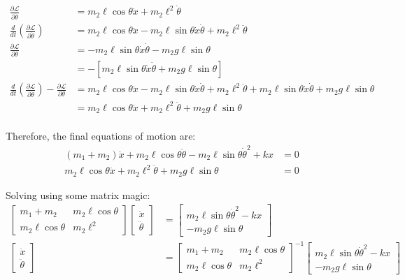 \documentclass[letterpaper,8pt]{article}
\begin{document}
\begin{align*}
\frac{\partial \mathcal{L}}{\partial \dot{\theta}} &= m_2\ell\cos\theta\dot{x} + m_2\ell^2\dot{\theta} \\
\frac{d}{dt} \left( \frac{\partial \mathcal{L}}{\partial \dot{\theta}} \right) &= m_2\ell\cos\theta\ddot{x} - m_2\ell\sin\theta\dot{x}\dot{\theta} 
         + m_2\ell^2\ddot{\theta} \\
\frac{\partial \mathcal{L}}{\partial \theta} &= -m_2\ell\sin\theta\dot{x}\dot{\theta} - m_2g\ell\sin\theta \\
         &= - \left[ m_2\ell\sin\theta\dot{x}\dot{\theta} + m_2g\ell\sin\theta \right] \\
\frac{d}{dt} \left( \frac{\partial \mathcal{L}}{\partial \dot{\theta}} \right) - \frac{\partial \mathcal{L}}{\partial \theta} &=
         m_2\ell\cos\theta\ddot{x} - m_2\ell\sin\theta\dot{x}\dot{\theta} + m_2\ell^2\ddot{\theta} 
         + m_2\ell\sin\theta\dot{x}\dot{\theta} + m_2g\ell\sin\theta \\
         &= m_2\ell\cos\theta\ddot{x} + m_2\ell^2\ddot{\theta} + m_2g\ell\sin\theta \\
\end{align*}


Therefore, the final equations of motion are:
\begin{align*}
(m_1 + m_2)\ddot{x} + m_2\ell\cos\theta\ddot{\theta} - m_2\ell\sin\theta\dot{\theta}^2 + kx &= 0 \\
 m_2\ell\cos\theta\ddot{x} + m_2\ell^2\ddot{\theta} + m_2g\ell\sin\theta &= 0 
\end{align*}

Solving using some matrix magic:
\begin{align*}
\left[ 
    \begin{array}{cc} m_1 + m_2 & m_2\ell\cos\theta \\
                      m_2\ell\cos\theta & m_2\ell^2
    \end{array} 
\right]
\left[ 
    \begin{array}{c}  \ddot{x} \\ \ddot{\theta} 
    \end{array}
\right]
&=
\left[ 
    \begin{array}{c}
         m_2\ell\sin\theta\dot{\theta}^2 - kx \\ -m_2g\ell\sin\theta
    \end{array}
\right] \\
\left[ 
    \begin{array}{c}  \ddot{x} \\ \ddot{\theta} 
    \end{array}
\right]
&=
\left[ 
    \begin{array}{cc} m_1 + m_2 & m_2\ell\cos\theta \\
                      m_2\ell\cos\theta & m_2\ell^2
    \end{array} 
\right]^{-1}
\left[ 
    \begin{array}{c}
         m_2\ell\sin\theta\dot{\theta}^2 - kx \\ -m_2g\ell\sin\theta
    \end{array}
\right] 
\end{align*}
\end{document}
